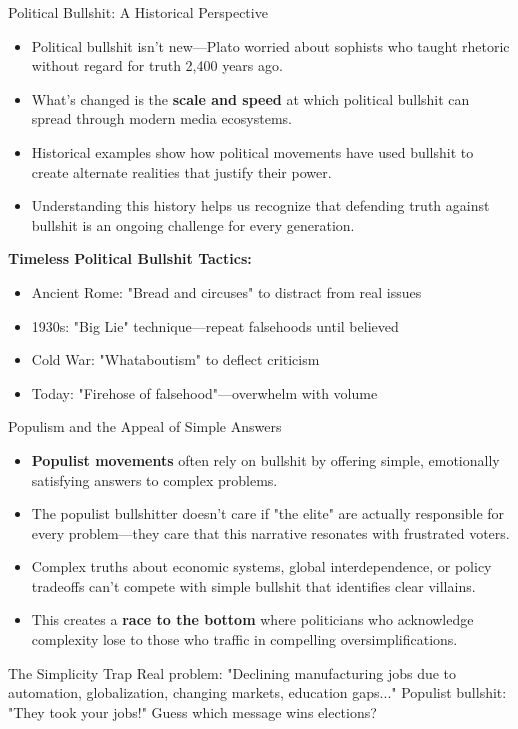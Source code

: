 \documentclass{beamer}
\begin{document}
	\begin{frame}{Political Bullshit: A Historical Perspective}
		\begin{itemize}
			\item Political bullshit isn't new—Plato worried about sophists who taught rhetoric without regard for truth 2,400 years ago.
			\item What's changed is the \textbf{scale and speed} at which political bullshit can spread through modern media ecosystems.
			\item Historical examples show how political movements have used bullshit to create alternate realities that justify their power.
			\item Understanding this history helps us recognize that defending truth against bullshit is an ongoing challenge for every generation.
		\end{itemize}
		
		\begin{example}
			\textbf{Timeless Political Bullshit Tactics:}
			\begin{itemize}
				\item Ancient Rome: "Bread and circuses" to distract from real issues
				\item 1930s: "Big Lie" technique—repeat falsehoods until believed
				\item Cold War: "Whataboutism" to deflect criticism
				\item Today: "Firehose of falsehood"—overwhelm with volume
			\end{itemize}
		\end{example}
	\end{frame}
	
	\begin{frame}{Populism and the Appeal of Simple Answers}
		\begin{itemize}
			\item \textbf{Populist movements} often rely on bullshit by offering simple, emotionally satisfying answers to complex problems.
			\item The populist bullshitter doesn't care if "the elite" are actually responsible for every problem—they care that this narrative resonates with frustrated voters.
			\item Complex truths about economic systems, global interdependence, or policy tradeoffs can't compete with simple bullshit that identifies clear villains.
			\item This creates a \textbf{race to the bottom} where politicians who acknowledge complexity lose to those who traffic in compelling oversimplifications.
		\end{itemize}
		
		\begin{alertblock}{The Simplicity Trap}
			Real problem: "Declining manufacturing jobs due to automation, globalization, changing markets, education gaps..."
			Populist bullshit: "They took your jobs!"
			Guess which message wins elections?
		\end{alertblock}
	\end{frame}
	
\end{document}
